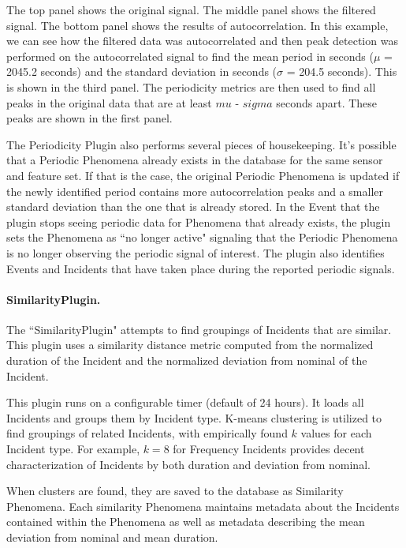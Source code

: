 The top panel shows the original signal. The middle panel shows the filtered signal. The bottom panel shows the results of autocorrelation. In this example, we can see how the filtered data was autocorrelated and then peak detection was performed on the autocorrelated signal to find the mean period in seconds ($\mu$ = 2045.2 seconds) and the standard deviation in seconds ($\sigma$ = 204.5 seconds). This is shown in the third panel. The periodicity metrics are then used to find all peaks in the original data that are at least $mu$ - $sigma$ seconds apart. These peaks are shown in the first panel.

The Periodicity Plugin also performs several pieces of housekeeping. It's possible that a Periodic Phenomena already exists in the database for the same sensor and feature set. If that is the case, the original Periodic Phenomena is updated if the newly identified period contains more autocorrelation peaks and a smaller standard deviation than the one that is already stored. In the Event that the plugin stops seeing periodic data for Phenomena that already exists, the plugin sets the Phenomena as ``no longer active" signaling that the Periodic Phenomena is no longer observing the periodic signal of interest. The plugin also identifies Events and Incidents that have taken place during the reported periodic signals.

\paragraph{SimilarityPlugin.}
The ``SimilarityPlugin" attempts to find groupings of Incidents that are similar. This plugin uses a similarity distance metric computed from the normalized duration of the Incident and the normalized deviation from nominal of the Incident.

This plugin runs on a configurable timer (default of 24 hours). It loads all Incidents and groups them by Incident type. K-means clustering is utilized to find groupings of related Incidents, with empirically found $k$ values for each Incident type. For example, $k=8$ for Frequency Incidents provides decent characterization of Incidents by both duration and deviation from nominal.

When clusters are found, they are saved to the database as Similarity Phenomena. Each similarity Phenomena maintains metadata about the Incidents contained within the Phenomena as well as metadata describing the mean deviation from nominal and mean duration.

